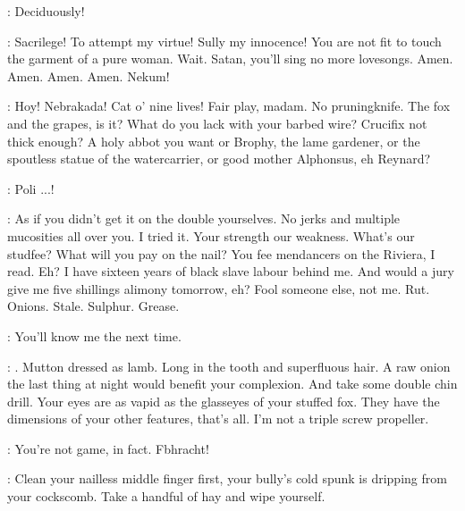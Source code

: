 \Yews:
Deciduously!

\Nymph:
Sacrilege!
To attempt my virtue!
Sully my innocence!
You are not fit to touch the garment of a pure woman.
Wait.
Satan, you'll sing no more lovesongs.
Amen. Amen. Amen. Amen.
Nekum!

\Bloom:
Hoy!
Nebrakada!
Cat o' nine lives!
Fair play, madam.
No pruningknife.
The fox and the grapes, is it?
What do you lack with your barbed wire?
Crucifix not thick enough?
A holy abbot you want or Brophy, the lame gardener,
or the spoutless statue of the watercarrier,
or good mother Alphonsus, eh Reynard?

\Nymph:
Poli ...!

\Bloom:
As if you didn't get it on the double yourselves.
No jerks and multiple mucosities all over you.
I tried it.
Your strength our weakness.
What's our studfee?
What will you pay on the nail?
You fee mendancers on the Riviera, I read.
Eh?
I have sixteen years of black slave labour behind me.
And would a jury give me five shillings alimony tomorrow, eh?
Fool someone else, not me.
Rut. Onions. Stale. Sulphur. Grease.


\Bella:
You'll know me the next time.

\Bloom:
.
Mutton dressed as lamb.
Long in the tooth and superfluous hair.
A raw onion the last thing at night would benefit your complexion.
And take some double chin drill.
Your eyes are as vapid as the glasseyes of your stuffed fox.
They have the dimensions of your other features, that's all.
I'm not a triple screw propeller.

\Bella:
You're not game, in fact.
Fbhracht!%

\Bloom:
Clean your nailless middle finger first,
your bully's cold spunk is dripping from your cockscomb.
Take a handful of hay and wipe yourself.

